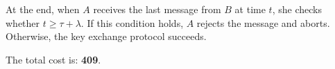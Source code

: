 \vspace{1cm}


At the end, when $A$ receives the last message from $B$ at time $t$, she checks whether $t \geq \tau + \lambda$. If
this condition holds, $A$ rejects the message and aborts. Otherwise, the key exchange protocol succeeds.
\vspace{1cm}

The total cost is: \textbf{409}.
